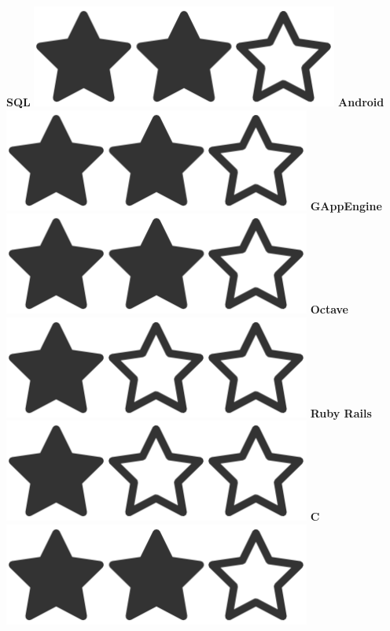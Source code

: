 \documentclass[]{friggeri-cv}
\begin{document}
\begin{aside}
    \textbf{SQL  }\includegraphics[scale=0.07]{img/2heart.png}
    \textbf{Android  }\includegraphics[scale=0.07]{img/2heart.png}
    \textbf{GAppEngine  }\includegraphics[scale=0.07]{img/2heart.png}
    \textbf{Octave  }\includegraphics[scale=0.07]{img/1heart.png}
    \textbf{Ruby Rails  }\includegraphics[scale=0.07]{img/1heart.png}  
    \textbf{C  }\includegraphics[scale=0.07]{img/2heart.png}

\end{aside}
\end{document}

